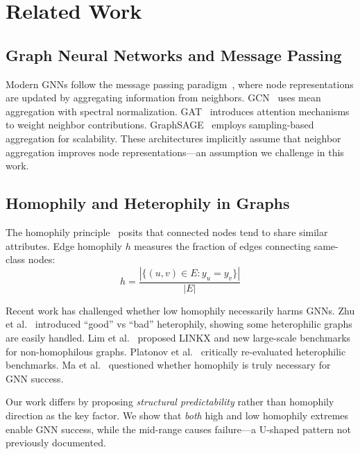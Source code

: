 
\section{Related Work}
\label{sec:related}

\subsection{Graph Neural Networks and Message Passing}

Modern GNNs follow the message passing paradigm~\cite{gilmer2017mpnn, wu2021comprehensive}, where node representations are updated by aggregating information from neighbors. GCN~\cite{kipf2017gcn} uses mean aggregation with spectral normalization. GAT~\cite{velivckovic2018gat} introduces attention mechanisms to weight neighbor contributions. GraphSAGE~\cite{hamilton2017graphsage} employs sampling-based aggregation for scalability. These architectures implicitly assume that neighbor aggregation improves node representations---an assumption we challenge in this work.

\subsection{Homophily and Heterophily in Graphs}

The homophily principle~\cite{mcpherson2001homophily} posits that connected nodes tend to share similar attributes. Edge homophily $h$ measures the fraction of edges connecting same-class nodes:
\begin{equation}
    h = \frac{|\{(u,v) \in E : y_u = y_v\}|}{|E|}
\end{equation}

Recent work has challenged whether low homophily necessarily harms GNNs. Zhu et al.~\cite{zhu2020beyond} introduced ``good'' vs ``bad'' heterophily, showing some heterophilic graphs are easily handled. Lim et al.~\cite{lim2021large} proposed LINKX and new large-scale benchmarks for non-homophilous graphs. Platonov et al.~\cite{platonov2023heterophilous} critically re-evaluated heterophilic benchmarks. Ma et al.~\cite{ma2022isgnn} questioned whether homophily is truly necessary for GNN success.

Our work differs by proposing \textit{structural predictability} rather than homophily direction as the key factor. We show that \textit{both} high and low homophily extremes enable GNN success, while the mid-range causes failure---a U-shaped pattern not previously documented.


